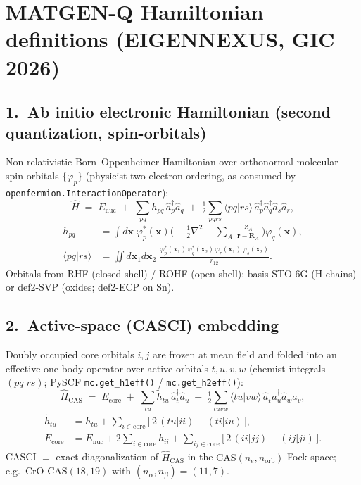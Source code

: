 \documentclass[11pt]{article}
\begin{document}
\section*{MATGEN-Q Hamiltonian definitions (EIGENNEXUS, GIC 2026)}

\subsection*{1.\ Ab initio electronic Hamiltonian (second quantization, spin-orbitals)}
Non-relativistic Born--Oppenheimer Hamiltonian over orthonormal molecular
spin-orbitals $\{\varphi_p\}$ (physicist two-electron ordering, as consumed by
\texttt{openfermion.InteractionOperator}):
\begin{equation}
\hat H \;=\; E_{\mathrm{nuc}}
\;+\; \sum_{pq} h_{pq}\, \hat a_p^{\dagger} \hat a_q
\;+\; \tfrac12 \sum_{pqrs} \langle pq|rs\rangle\,
      \hat a_p^{\dagger} \hat a_q^{\dagger} \hat a_s \hat a_r ,
\end{equation}
\begin{align}
h_{pq} &= \int \! d\bm{x}\;
  \varphi_p^{*}(\bm{x}) \Big( -\tfrac12 \nabla^2
  - \sum_{A} \frac{Z_A}{|\bm{r}-\bm{R}_A|} \Big) \varphi_q(\bm{x}), \\[2pt]
\langle pq|rs\rangle &= \iint \! d\bm{x}_1 d\bm{x}_2\;
  \frac{\varphi_p^{*}(\bm{x}_1)\,\varphi_q^{*}(\bm{x}_2)\,
        \varphi_r(\bm{x}_1)\,\varphi_s(\bm{x}_2)}{r_{12}} .
\end{align}
Orbitals from RHF (closed shell) / ROHF (open shell); basis STO-6G (H chains)
or def2-SVP (oxides; def2-ECP on Sn).

\subsection*{2.\ Active-space (CASCI) embedding}
Doubly occupied core orbitals $i,j$ are frozen at mean field and folded into an
effective one-body operator over active orbitals $t,u,v,w$ (chemist integrals
$(pq|rs)$; PySCF \texttt{mc.get\_h1eff()} / \texttt{mc.get\_h2eff()}):
\begin{equation}
\hat H_{\mathrm{CAS}} \;=\; E_{\mathrm{core}}
\;+\; \sum_{tu} \tilde h_{tu}\, \hat a_t^{\dagger} \hat a_u
\;+\; \tfrac12 \sum_{tuvw} \langle tu|vw\rangle\,
      \hat a_t^{\dagger} \hat a_u^{\dagger} \hat a_w \hat a_v ,
\end{equation}
\begin{align}
\tilde h_{tu} &= h_{tu} + \sum_{i\in\mathrm{core}}
   \big[\, 2\,(tu|ii) - (ti|iu) \,\big], \\[2pt]
E_{\mathrm{core}} &= E_{\mathrm{nuc}}
   + 2\sum_{i\in\mathrm{core}} h_{ii}
   + \sum_{ij\in\mathrm{core}} \big[\, 2\,(ii|jj) - (ij|ji) \,\big].
\end{align}
CASCI $=$ exact diagonalization of $\hat H_{\mathrm{CAS}}$ in the
$\mathrm{CAS}(n_e, n_{\mathrm{orb}})$ Fock space; e.g.\ CrO
$\mathrm{CAS}(18,19)$ with $(n_\alpha,n_\beta)=(11,7)$.
\end{document}
